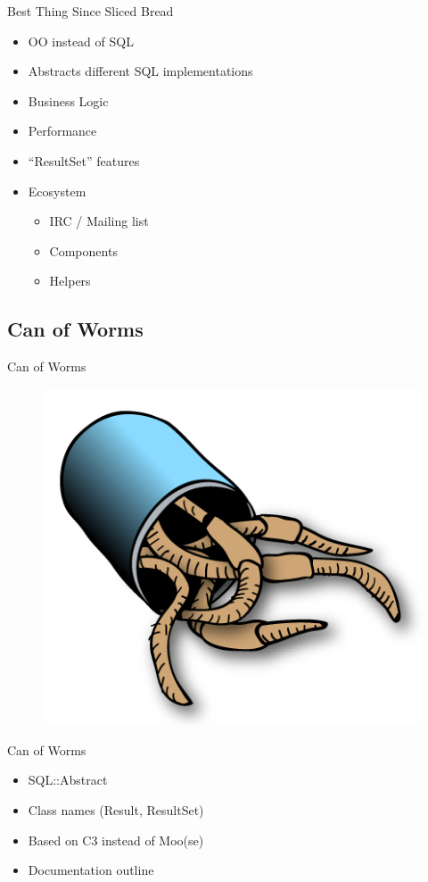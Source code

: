 \begin{frame}{Best Thing Since Sliced Bread}
\begin{itemize}
\item OO instead of SQL
\item Abstracts different SQL implementations
\item Business Logic
\item Performance
\item ``ResultSet'' features
\item Ecosystem
\begin{itemize}
\item IRC / Mailing list
\item Components
\item Helpers
\end{itemize}
\end{itemize}
\end{frame}

\subsection{Can of Worms}

\begin{frame}{Can of Worms}
\begin{figure}[!ht]
\centering
\includegraphics[width=0.75\linewidth]{img/canofworms.png}
\end{figure}
\end{frame}

\begin{frame}{Can of Worms}
\begin{itemize}
\item SQL::Abstract
\item Class names (Result, ResultSet)
\item Based on C3 instead of Moo(se)
\item Documentation outline
\end{itemize}
\end{frame}

